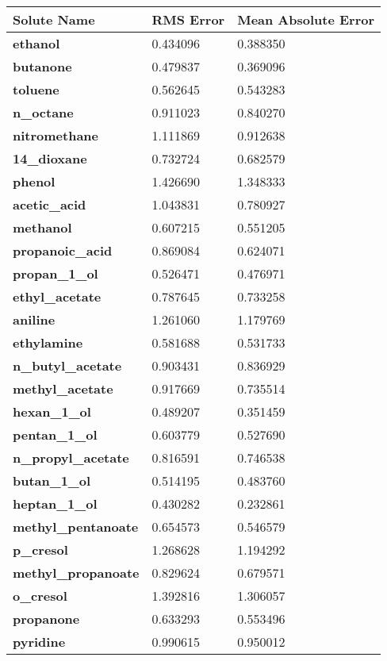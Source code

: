 \documentclass{amsart}
\begin{document}
 
\begin{center}
\begin{tabular}{|l|l|l|} 
\hline  
\textbf{Solute Name}&\textbf{RMS Error}&\textbf{Mean Absolute Error} \\ \hline
\hline 
\textbf{ethanol}&0.434096&0.388350 \\ \hline 
\textbf{butanone}&0.479837&0.369096 \\ \hline 
\textbf{toluene}&0.562645&0.543283 \\ \hline 
\textbf{n\_octane}&0.911023&0.840270 \\ \hline 
\textbf{nitromethane}&1.111869&0.912638 \\ \hline 
\textbf{14\_dioxane}&0.732724&0.682579 \\ \hline 
\textbf{phenol}&1.426690&1.348333 \\ \hline 
\textbf{acetic\_acid}&1.043831&0.780927 \\ \hline 
\textbf{methanol}&0.607215&0.551205 \\ \hline 
\textbf{propanoic\_acid}&0.869084&0.624071 \\ \hline 
\textbf{propan\_1\_ol}&0.526471&0.476971 \\ \hline 
\textbf{ethyl\_acetate}&0.787645&0.733258 \\ \hline 
\textbf{aniline}&1.261060&1.179769 \\ \hline 
\textbf{ethylamine}&0.581688&0.531733 \\ \hline 
\textbf{n\_butyl\_acetate}&0.903431&0.836929 \\ \hline 
\textbf{methyl\_acetate}&0.917669&0.735514 \\ \hline 
\textbf{hexan\_1\_ol}&0.489207&0.351459 \\ \hline 
\textbf{pentan\_1\_ol}&0.603779&0.527690 \\ \hline 
\textbf{n\_propyl\_acetate}&0.816591&0.746538 \\ \hline 
\textbf{butan\_1\_ol}&0.514195&0.483760 \\ \hline 
\textbf{heptan\_1\_ol}&0.430282&0.232861 \\ \hline 
\textbf{methyl\_pentanoate}&0.654573&0.546579 \\ \hline 
\textbf{p\_cresol}&1.268628&1.194292 \\ \hline 
\textbf{methyl\_propanoate}&0.829624&0.679571 \\ \hline 
\textbf{o\_cresol}&1.392816&1.306057 \\ \hline 
\textbf{propanone}&0.633293&0.553496 \\ \hline 
\textbf{pyridine}&0.990615&0.950012 \\ \hline 
\end{tabular} 
\end{center} 
\end{document}
